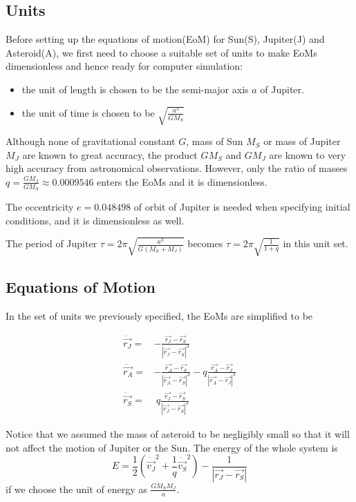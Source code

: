 \documentclass[12pt,a4paper]{article}
\begin{document}
\subsection{Units}

Before setting up the equations of motion(EoM) for Sun(S), Jupiter(J) and Asteroid(A), we first need to choose a suitable set of units to make EoMs dimensionless and hence ready for computer simulation:

\begin{itemize}
	\item the unit of length is chosen to be the semi-major axis $a$ of Jupiter.
	\item the unit of time is chosen to be $\displaystyle{\sqrt{\frac{a^3}{GM_S}}}$
\end{itemize}
	
Although none of gravitational constant $G$, mass of Sun $M_S$ or mass of Jupiter $M_J$ are known to great accuracy, the product $GM_S$ and $GM_J$ are known to very high accuracy from astronomical observations. However, only the ratio of masses $\displaystyle{q = \frac{GM_J}{GM_S} \approx 0.0009546}$ enters the EoMs and it is dimensionless.

The eccentricity $e= 0.048498$ of orbit of Jupiter is needed when specifying initial conditions, and it is dimensionless as well.

The period of Jupiter $\displaystyle{\tau = 2\pi \sqrt{\frac{a^3}{G(M_S+M_J)}}}$ becomes $\displaystyle{\tau = 2\pi \sqrt{\frac{1}{1+q}}}$ in this unit set.

\subsection{Equations of Motion}
 
In the set of units we previously specified, the EoMs are simplified to be

\begin{align}
	\ddot{\vec{r_J}} =& - \frac{\vec{r_J}-\vec{r_S}} {{|\vec{r_J}-\vec{r_S}|}^3} \\
	\ddot{\vec{r_A}} =& - \frac{\vec{r_A}-\vec{r_S}} {{|\vec{r_A}-\vec{r_S}|}^3} - q \frac{\vec{r_A}-\vec{r_J}} {{|\vec{r_A}-\vec{r_J}|}^3} \\	
	\ddot{\vec{r_S}} =& \;  q \frac{\vec{r_J}-\vec{r_S}} {{|\vec{r_J}-\vec{r_S}|}^3}
\end{align}

Notice that we assumed the mass of asteroid to be negligibly small so that it will not affect the motion of Jupiter or the Sun. The energy of the whole system is 
\begin{equation}
E = \frac{1}{2} \left({\dot{\vec{v_J}}}^2 +  \frac{1}{q} {\dot{\vec{v_S}}}^2 \right) - \frac{1}{|\vec{r_J}-\vec{r_S}|}
\end{equation}
if we choose the unit of energy as $\displaystyle{\frac{GM_{S}M_{J}}{a}}$.
\end{document}
